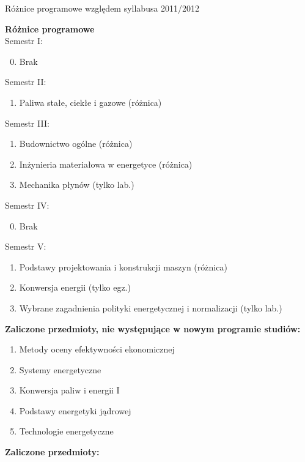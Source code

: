 \documentclass[a4paper,12pt]{article}
\begin{document}
\begin{center}
\Large{Różnice programowe względem syllabusa 2011/2012}
\end{center}
\vspace{20pt}
\textbf{Różnice programowe}\\
Semestr I:
\begin{enumerate}
\setcounter{enumi}{-1}
\item Brak
\end{enumerate}
Semestr II:
\begin{enumerate}
\item Paliwa stałe, ciekłe i gazowe (różnica)
\end{enumerate}
Semestr III:
\begin{enumerate}
\item Budownictwo ogólne (różnica)
\item Inżynieria materiałowa w energetyce (różnica)
\item Mechanika płynów (tylko lab.)
\end{enumerate}
Semestr IV:
\begin{enumerate}
\setcounter{enumi}{-1}
\item Brak
\end{enumerate}
Semestr V:
\begin{enumerate}
\item Podstawy projektowania i konstrukcji maszyn (różnica)
\item Konwersja energii (tylko egz.)
\item Wybrane zagadnienia polityki energetycznej i normalizacji (tylko lab.)
\end{enumerate}
\vspace{20pt}
\textbf{Zaliczone przedmioty, nie występujące w nowym programie studiów:}
\begin{enumerate}
\item Metody oceny efektywności ekonomicznej
\item Systemy energetyczne
\item Konwersja paliw i energii I
\item Podstawy energetyki jądrowej
\item Technologie energetyczne
\end{enumerate}
\newpage
\textbf{Zaliczone przedmioty:}
\end{document}
